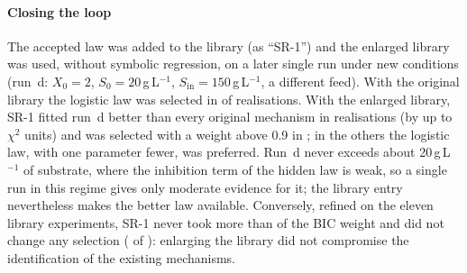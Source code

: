 \paragraph{Closing the loop}
The accepted law was added to the library (as ``SR-1'') and the enlarged library was used, without symbolic regression, on a later single run under new conditions (run~d: $X_0=2$, $S_0=20$\,g\,L$^{-1}$, $S_{\mathrm{in}}=150$\,g\,L$^{-1}$, a different feed). With the original library the logistic law was selected in \ConeLaterBaseCount{} of \ConeLoopN{} realisations. With the enlarged library, SR-1 fitted run~d better than every original mechanism in \ConeLaterBetterChi{} realisations (by up to \ConeLaterDchiMax{} $\chi^2$ units) and was selected with a weight above 0.9 in \ConeLaterStrong{}; in the others the logistic law, with one parameter fewer, was preferred. Run~d never exceeds about 20\,g\,L$^{-1}$ of substrate, where the inhibition term of the hidden law is weak, so a single run in this regime gives only moderate evidence for it; the library entry nevertheless makes the better law available. Conversely, refined on the eleven library experiments, SR-1 never took more than \ConeStealMax{} of the BIC weight and did not change any selection (\ConeStealChanged{} of \ConeStealCases{}): enlarging the library did not compromise the identification of the existing mechanisms.
